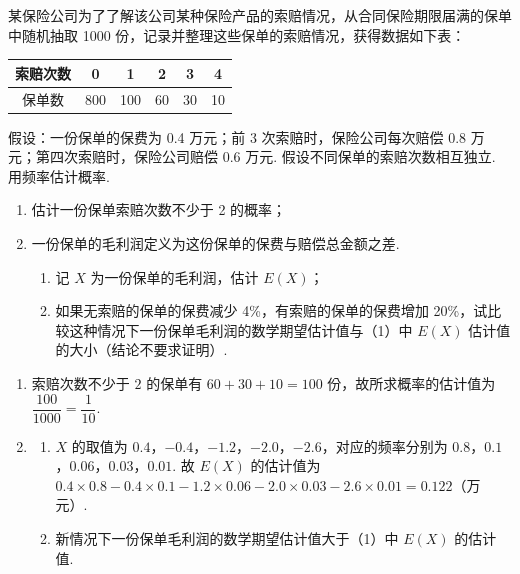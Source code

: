 \begin{problem}
某保险公司为了了解该公司某种保险产品的索赔情况，从合同保险期限届满的保单中随机抽取 1000 份，记录并整理这些保单的索赔情况，获得数据如下表：

\begin{center}
\begin{tabular}{|c|c|c|c|c|c|}
\hline
索赔次数 & 0 & 1 & 2 & 3 & 4 \\
\hline
保单数 & 800 & 100 & 60 & 30 & 10 \\
\hline
\end{tabular}
\end{center}

假设：一份保单的保费为 0.4 万元；前 3 次索赔时，保险公司每次赔偿 0.8 万元；第四次索赔时，保险公司赔偿 0.6 万元. 假设不同保单的索赔次数相互独立. 用频率估计概率.

\begin{enumerate}
\item 估计一份保单索赔次数不少于 2 的概率；
\item 一份保单的毛利润定义为这份保单的保费与赔偿总金额之差.
    \begin{enumerate}
    \item 记 \(X\) 为一份保单的毛利润，估计 \(E(X)\)；
    \item 如果无索赔的保单的保费减少 4\%，有索赔的保单的保费增加 20\%，试比较这种情况下一份保单毛利润的数学期望估计值与（1）中 \(E(X)\) 估计值的大小（结论不要求证明）.
    \end{enumerate}
\end{enumerate}
\end{problem}

\begin{solution}
\begin{enumerate}
\item 索赔次数不少于 \(2\) 的保单有 \(60+30+10=100\) 份，故所求概率的估计值为 \(\dfrac{100}{1000}=\dfrac1{10}\).
\item
    \begin{enumerate}
    \item \(X\) 的取值为 \(0.4\)，\(-0.4\)，\(-1.2\)，\(-2.0\)，\(-2.6\)，对应的频率分别为 \(0.8\)，\(0.1\)，\(0.06\)，\(0.03\)，\(0.01\). 故 \(E(X)\) 的估计值为 \(0.4\times0.8-0.4\times0.1-1.2\times0.06-2.0\times0.03-2.6\times0.01=0.122\)（万元）.
    \item 新情况下一份保单毛利润的数学期望估计值大于（1）中 \(E(X)\) 的估计值.
    \end{enumerate}
\end{enumerate}
\end{solution}

